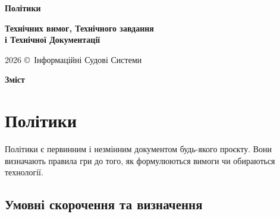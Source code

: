 \documentclass{article}
\newcommand\HUGE[1]{\fontsize{40}{40}\selectfont #1}
\begin{document}
\pagestyle{fancy}

\begin{titlepage}
  \AddToShipoutPictureBG*{\AtPageLowerLeft{\color{nato}\rule{\paperwidth}{\paperheight}}}
  \color{white}\thispagestyle{empty}\vspace*{4cm}\centering
  {\Huge  \textbf{} \par} \vspace{2cm}
  {\HUGE  \textbf{Політики} \par} \vspace{2.5cm}
  {\LARGE \textbf{Технічних вимог, Технічного завдання \\ і Технічної Документації} \par} \vspace{2.5cm}
  \vfill
  {\large 2026 \copyright\ Інформаційні Судові Системи \par}
\end{titlepage}

\newpage

\begin{center}
  {\Huge\color{nato}\bfseries Зміст\par}
\end{center}
\vspace{40pt}
\tableofcontents

\begin{abstract}
  У статті подаються універсальні засади політик проектів для
  державних ІТ підприємств, типовий зміст технічних вимог з повною таксономією підрозділів та
  структурою технічного завдання відповідно до ДСТУ.
  Показані принципи, як політики визначають вимоги, що узгоджують технічне завдання та посилання на ключові
  державні стандарти документування ДСТУ. Матеріал призначений для архітекторів, аналітиків та розробників,
  які працюють над державними та комерційними проєктами в Україні.
\end{abstract}

\newpage

\section{Політики}

Політики є первинним і незмінним документом будь-якого проєкту.
Вони визначають правила гри до того, як формулюються вимоги чи обираються технології.

\subsection*{Умовні скорочення та визначення}
\end{document}

